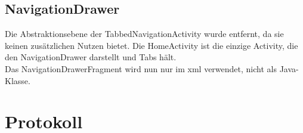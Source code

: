 \documentclass[parskip=full,11pt]{scrartcl}
\begin{document}
\subsection{NavigationDrawer}
Die Abstraktionsebene der TabbedNavigationActivity wurde entfernt, da
sie keinen zusätzlichen Nutzen bietet. Die HomeActivity ist die einzige
Activity, die den NavigationDrawer darstellt und Tabs hält.\\
Das NavigationDrawerFragment wird nun nur im xml verwendet, nicht als Java-Klasse.


\pagebreak
\section{Protokoll}
\end{document}
